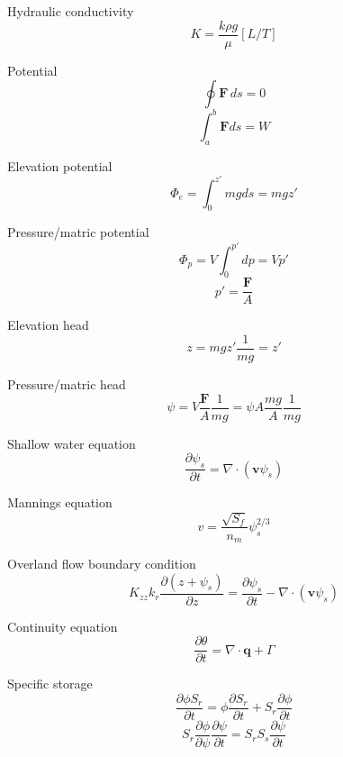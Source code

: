 \documentclass[12pt]{article}
\begin{document}
Hydraulic conductivity
\begin{equation}K=\frac{k \rho g}{\mu} [L/T]\end{equation}

Potential
\begin{equation}\oint \mathbf{F} \,ds = 0\end{equation}
\begin{equation}\int_{a}^{b} \mathbf{F} ds = W\end{equation}

Elevation potential
\begin{equation}\Phi_{e}=\int_{0}^{z'} mg ds = mgz'\end{equation}

Pressure/matric potential
\begin{equation}\Phi_{p}=V \int_{0}^{p'} dp = V p'\end{equation}
\begin{equation}p'=\frac{\mathbf{F}}{A}\end{equation}

Elevation head
\begin{equation}z=mgz' \frac{1}{mg}=z'\end{equation}

Pressure/matric head
\begin{equation}\psi=V\frac{\mathbf{F}}{A} \frac{1}{mg}= \psi A \frac{mg}{A}\frac{1}{mg}\end{equation} 

Shallow water equation
\begin{equation}\frac{\partial \psi_{s}}{\partial t} = \nabla \cdot (\mathbf{v} \psi_{s})\end{equation}

Mannings equation
\begin{equation}v=\frac{ \sqrt{S_{f}}} {n_{m}} \psi_s^{2/3}\end{equation}

Overland flow boundary condition
\begin{equation}K_{zz} k_r \frac{\partial (z+\psi_s)}{\partial z} = \frac{\partial \psi_s}{\partial t} - \nabla \cdot (\mathbf{v} \psi_s)\end{equation}

Continuity equation
\begin{equation}\frac{\partial \theta}{\partial t} = \nabla \cdot \mathbf{q} + \Gamma\end{equation}

Specific storage
\begin{equation}\frac{\partial \phi S_r}{\partial t}=\phi \frac{\partial S_r}{\partial t} +  S_r \frac{\partial \phi}{\partial t}\end{equation}
\begin{equation}S_r \frac{\partial \phi}{\partial \psi} \frac{\partial \psi}{\partial t}=S_r S_s \frac{\partial \psi}{\partial t}\end{equation}
\end{document}
